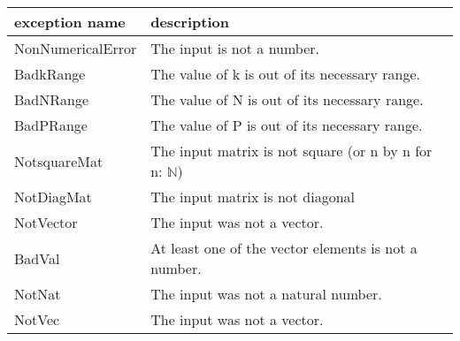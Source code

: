 \documentclass[12pt, titlepage]{article}
\begin{document}
\renewcommand{\arraystretch}{1.2}
\begin{tabular}{l l} 
	\toprule		
	\textbf{exception name} & \textbf{description}\\
	\midrule 
	NonNumericalError & The input is not a number.\\ 
	BadkRange & The value of k is out of its necessary range.\\ 
	BadNRange & The value of N is out of its necessary range.\\ 
	BadPRange & The value of P is out of its necessary range.\\ 
	NotsquareMat & The input matrix is not square (or n by n for n: 
	$\mathbb{N}$)\\ 
	NotDiagMat & The input matrix is not diagonal \\ 
	NotVector & The input was not a vector. \\ 
	BadVal & At least one of the vector elements is not a number. \\ 
	NotNat & The input was not a natural number. \\
	NotVec & The input was not a vector.\\
	\bottomrule
\end{tabular}\\
\end{document}
